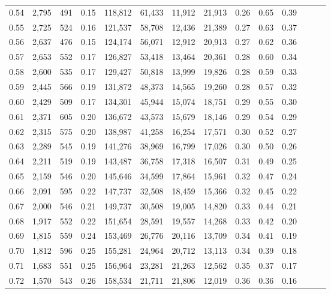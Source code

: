 \begin{tabular}{rrrrrrrrrrrrrr}
0.54 &  2,795 &  491 &  0.15 &  118,812 &   61,433 &  11,912 &  21,913 &  0.26 &  0.65 &      0.39 \\
0.55 &  2,725 &  524 &  0.16 &  121,537 &   58,708 &  12,436 &  21,389 &  0.27 &  0.63 &      0.37 \\
0.56 &  2,637 &  476 &  0.15 &  124,174 &   56,071 &  12,912 &  20,913 &  0.27 &  0.62 &      0.36 \\
0.57 &  2,653 &  552 &  0.17 &  126,827 &   53,418 &  13,464 &  20,361 &  0.28 &  0.60 &      0.34 \\
0.58 &  2,600 &  535 &  0.17 &  129,427 &   50,818 &  13,999 &  19,826 &  0.28 &  0.59 &      0.33 \\
0.59 &  2,445 &  566 &  0.19 &  131,872 &   48,373 &  14,565 &  19,260 &  0.28 &  0.57 &      0.32 \\
0.60 &  2,429 &  509 &  0.17 &  134,301 &   45,944 &  15,074 &  18,751 &  0.29 &  0.55 &      0.30 \\
0.61 &  2,371 &  605 &  0.20 &  136,672 &   43,573 &  15,679 &  18,146 &  0.29 &  0.54 &      0.29 \\
0.62 &  2,315 &  575 &  0.20 &  138,987 &   41,258 &  16,254 &  17,571 &  0.30 &  0.52 &      0.27 \\
0.63 &  2,289 &  545 &  0.19 &  141,276 &   38,969 &  16,799 &  17,026 &  0.30 &  0.50 &      0.26 \\
0.64 &  2,211 &  519 &  0.19 &  143,487 &   36,758 &  17,318 &  16,507 &  0.31 &  0.49 &      0.25 \\
0.65 &  2,159 &  546 &  0.20 &  145,646 &   34,599 &  17,864 &  15,961 &  0.32 &  0.47 &      0.24 \\
0.66 &  2,091 &  595 &  0.22 &  147,737 &   32,508 &  18,459 &  15,366 &  0.32 &  0.45 &      0.22 \\
0.67 &  2,000 &  546 &  0.21 &  149,737 &   30,508 &  19,005 &  14,820 &  0.33 &  0.44 &      0.21 \\
0.68 &  1,917 &  552 &  0.22 &  151,654 &   28,591 &  19,557 &  14,268 &  0.33 &  0.42 &      0.20 \\
0.69 &  1,815 &  559 &  0.24 &  153,469 &   26,776 &  20,116 &  13,709 &  0.34 &  0.41 &      0.19 \\
0.70 &  1,812 &  596 &  0.25 &  155,281 &   24,964 &  20,712 &  13,113 &  0.34 &  0.39 &      0.18 \\
0.71 &  1,683 &  551 &  0.25 &  156,964 &   23,281 &  21,263 &  12,562 &  0.35 &  0.37 &      0.17 \\
0.72 &  1,570 &  543 &  0.26 &  158,534 &   21,711 &  21,806 &  12,019 &  0.36 &  0.36 &      0.16 \\

\end{tabular}
